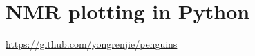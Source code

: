\section{NMR plotting in Python}
\label{sec:other__penguins}

\url{https://github.com/yongrenjie/penguins}
